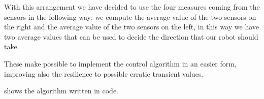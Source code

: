 With this arrangement we have decided to use the four measures coming from the
sensors in the following way: we compute the average value of the two sensors on
the right and the average value of the two sensors on the left, in this way we
have two average values that can be used to decide the direction that our robot
should take.

These make possible to implement the control algorithm in an easier form,
improving also the resilience to possible erratic transient values.

 shows the algorithm written in  code.


